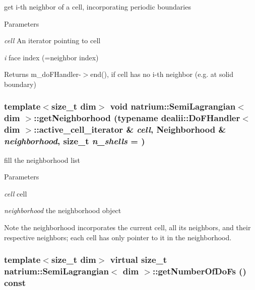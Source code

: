 get i-\/th neighbor of a cell, incorporating periodic boundaries 
\begin{DoxyParams}{Parameters}
\item[{\em cell}]An iterator pointing to cell \item[{\em i}]face index (=neighbor index) \end{DoxyParams}
\begin{DoxyReturn}{Returns}
m\_\-doFHandler-\/$>$end(), if cell has no i-\/th neighbor (e.g. at solid boundary) 
\end{DoxyReturn}
\hypertarget{classnatrium_1_1SemiLagrangian_ab6d5f8d666330d8f229ee727985592b8}{
\subsubsection[{getNeighborhood}]{\setlength{\rightskip}{0pt plus 5cm}template$<$size\_\-t dim$>$ void {\bf natrium::SemiLagrangian}$<$ dim $>$::getNeighborhood (typename dealii::DoFHandler$<$ dim $>$::active\_\-cell\_\-iterator \& {\em cell}, \/  {\bf Neighborhood} \& {\em neighborhood}, \/  size\_\-t {\em n\_\-shells} = {})}}
\label{classnatrium_1_1SemiLagrangian_ab6d5f8d666330d8f229ee727985592b8}


fill the neighborhood list 
\begin{DoxyParams}{Parameters}
\item[{\em cell}]cell \item[{\em neighborhood}]the neighborhood object \end{DoxyParams}
\begin{DoxyNote}{Note}
the neighborhood incorporates the current cell, all its neighbors, and their respective neighbors; each cell has only pointer to it in the neighborhood. 
\end{DoxyNote}
\hypertarget{classnatrium_1_1SemiLagrangian_aeb3b1dfda8a0d8fe7473716f98b12647}{
\subsubsection[{getNumberOfDoFs}]{\setlength{\rightskip}{0pt plus 5cm}template$<$size\_\-t dim$>$ virtual size\_\-t {\bf natrium::SemiLagrangian}$<$ dim $>$::getNumberOfDoFs () const}}
\label{classnatrium_1_1SemiLagrangian_aeb3b1dfda8a0d8fe7473716f98b12647}


